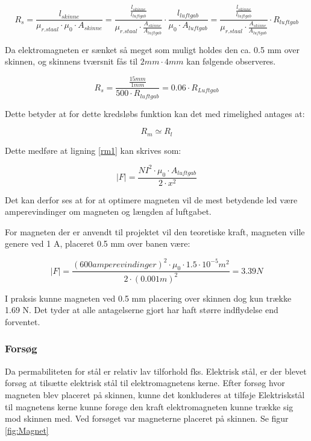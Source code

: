 \begin{equation}
R_s =  \frac{l_{skinne}}{\mu_{r.staal} \cdot \mu_0 \cdot A_{skinne} }
=
\frac{
	\frac{l_{skinne}}{l_{luftgab}} }{\mu_{r.staal} \cdot \frac{A_{skinne}}{A_{luftgab}} }\cdot \frac{l_{luftgab}}{\mu_0 \cdot A_{luftgab}}=\frac{
	\frac{l_{skinne}}{l_{luftgab}} }
	{\mu_{r.staal}\cdot\frac{A_{skinne}}{A_{luftgab}}}\cdot R_{luftgab}
\end{equation}


Da elektromagneten er sænket så meget som muligt holdes den ca. 0.5 mm over skinnen, og skinnens tværsnit fås til $2mm \cdot 4mm$ kan følgende observeres.

\begin{equation}
R_s =
\frac{\frac{15 mm}{1 mm} }
{ 500 \cdot R_{luftgab} }= 0.06\cdot R_{Luftgab}
	\end{equation}

Dette betyder at for dette kredsløbs funktion kan det med rimelighed antages at:

\begin{equation}
R_m \simeq R_l
	\end{equation}

Dette medføre at ligning \ref{rm1} kan skrives som:

\begin{equation}
\mid F \mid = \frac{NI^{2} \cdot \mu_0 \cdot A_{luftgab} } {2 \cdot x^2}
\end{equation}

Det kan derfor ses at for at optimere magneten vil de mest betydende led være amperevindinger om magneten og længden af luftgabet.

For magneten der er anvendt til projektet vil den teoretiske kraft, magneten ville genere ved 1 A, placeret 0.5 mm over banen være: %

\begin{equation}
\mid F \mid = \frac{(600 amperevindinger)^{2} \cdot \mu_0 \cdot 1.5 \cdot 10^{-5} m^2 } {2 \cdot (0.001m)^2} = 3.39 N
\end{equation}

I praksis kunne magneten ved 0.5 mm placering over skinnen dog kun trække  1.69 N. Det tyder at alle antagelserne gjort har haft større indflydelse end forventet.

\subsubsection{Forsøg}
Da permabiliteten for stål er relativ lav tilforhold fks. Elektrisk stål, er der blevet forsøg at tilsætte elektrisk stål til elektromagnetens kerne. Efter forsøg hvor magneten blev placeret på skinnen, kunne det konkluderes at tilføje Elektriskstål til magnetens kerne kunne forøge den kraft elektromagneten kunne trække sig mod skinnen med.
Ved forsøget var magneterne placeret på skinnen. Se figur \ref{fig:Magnet}

